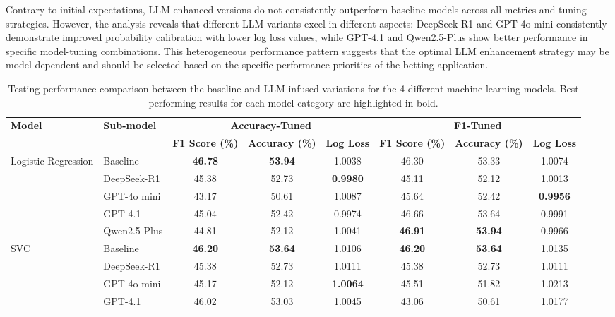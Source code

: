 \documentclass[conference]{IEEEtran}
\begin{document}
Contrary to initial expectations, LLM-enhanced versions do not consistently outperform baseline models across all metrics and tuning strategies. However, the analysis reveals that different LLM variants excel in different aspects: DeepSeek-R1 and GPT-4o mini consistently demonstrate improved probability calibration with lower log loss values, while GPT-4.1 and Qwen2.5-Plus show better performance in specific model-tuning combinations. This heterogeneous performance pattern suggests that the optimal LLM enhancement strategy may be model-dependent and should be selected based on the specific performance priorities of the betting application.

\begin{table}[htbp]
\caption{Testing performance comparison between the baseline and LLM-infused variations for the 4 different machine learning models. Best performing results for each model category are highlighted in bold.}
\label{tab:accuracy_calibration_results}
\centering
\scriptsize
\renewcommand{\arraystretch}{1.2}
\begin{tabular}{l l c c c c c c}
\hline
\multirow{2}{*}{\textbf{Model}} & \multirow{2}{*}{\textbf{Sub-model}} & \multicolumn{3}{c}{\textbf{Accuracy-Tuned}} & \multicolumn{3}{c}{\textbf{F1-Tuned}} \\
\cline{3-8}
& & \textbf{F1 Score (\%)} & \textbf{Accuracy (\%)} & \textbf{Log Loss} & \textbf{F1 Score (\%)} & \textbf{Accuracy (\%)} & \textbf{Log Loss} \\
\hline
\multirow{5}{*}{Logistic Regression} 
& Baseline & \textbf{46.78} & \textbf{53.94} & 1.0038 & 46.30 & 53.33 & 1.0074 \\
& DeepSeek-R1 & 45.38 & 52.73 & \textbf{0.9980} & 45.11 & 52.12 & 1.0013 \\
& GPT-4o mini & 43.17 & 50.61 & 1.0087 & 45.64 & 52.42 & \textbf{0.9956} \\
& GPT-4.1 & 45.04 & 52.42 & 0.9974 & 46.66 & 53.64 & 0.9991 \\
& Qwen2.5-Plus & 44.81 & 52.12 & 1.0041 & \textbf{46.91} & \textbf{53.94} & 0.9966 \\
\hline
\multirow{5}{*}{SVC}
& Baseline & \textbf{46.20} & \textbf{53.64} & 1.0106 & \textbf{46.20} & \textbf{53.64} & 1.0135 \\
& DeepSeek-R1 & 45.38 & 52.73 & 1.0111 & 45.38 & 52.73 & 1.0111 \\
& GPT-4o mini & 45.17 & 52.12 & \textbf{1.0064} & 45.51 & 51.82 & 1.0213 \\
& GPT-4.1 & 46.02 & 53.03 & 1.0045 & 43.06 & 50.61 & 1.0177 \\

\end{tabular}
\end{table}
\end{document}
